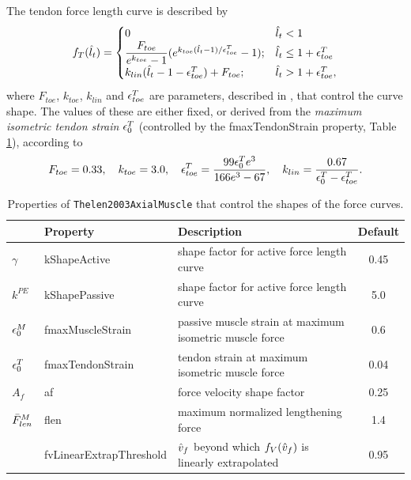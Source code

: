 The tendon force length curve is described by
\begin{equation}
f_T(\hat{l}_t) = 
\begin{cases}
0 & \hat{l}_t < 1 \\
\dfrac{F_{toe}}{e^{k_{toe}}-1}(e^{k_{toe} (\hat{l}_t-1)/\epsilon^T_{toe}}-1); &
\hat{l}_t \le 1+\epsilon^T_{toe}\\
k_{lin} (\hat{l}_t - 1 - \epsilon^T_{toe}) + F_{toe}; &
\hat{l}_t  > 1+\epsilon^T_{toe},
\end{cases}
\label{Thelen2003TFLC:eqn}
\end{equation}
%
where $F_{toe}$, $k_{toe}$, $k_{lin}$ and $\epsilon^T_{toe}$ are
parameters, described in \cite{thelen2003adjustment}, that control the
curve shape. The values of these are either fixed, or derived from the
{\it maximum isometric tendon strain} $\epsilon_0^T$ (controlled by the
{\sf fmaxTendonStrain} property, Table \ref{ThelenProps:tab}),
according to
%
\begin{equation}
F_{toe} = 0.33, \quad k_{toe} = 3.0, \quad
\epsilon^T_{toe} = \frac{99 \epsilon_0^T e^3}{166 e^3 - 67}, \quad
k_{lin} = \frac{0.67}{\epsilon_0^T - \epsilon^T_{toe}}.
\label{Thelen2003TFLCParams:eqn}
\end{equation}
%

\begin{table}[h]
\begin{center}
\begin{tabular}{|l|l|l|c|} 
\hline
& Property & Description & Default\\
\hline
$\gamma$ & {\sf kShapeActive} & 
shape factor for active force length curve & 0.45 \\
$k^{PE}$ & {\sf kShapePassive} & 
shape factor for active force length curve & 5.0 \\
$\epsilon_0^M$ & {\sf fmaxMuscleStrain} & 
passive muscle strain at maximum isometric muscle force & 0.6 \\
$\epsilon_0^T$ & {\sf fmaxTendonStrain} & 
tendon strain at maximum isometric muscle force & 0.04 \\
$A_f$ & {\sf af} & 
force velocity shape factor & 0.25 \\
$\bar{F}^M_{len}$ & {\sf flen} & 
maximum normalized lengthening force & 1.4 \\
& {\sf fvLinearExtrapThreshold} &
$\hat{v}_f$ beyond which $f_V(\hat{v}_f)$ is linearly extrapolated & 0.95\\
\hline
\end{tabular}
\end{center}
\caption{Properties of {\tt Thelen2003AxialMuscle} that control
the shapes of the force curves.}
\label{ThelenProps:tab}
\end{table}

